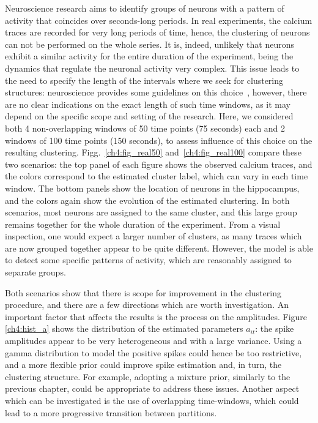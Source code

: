 Neuroscience research aims to identify groups of neurons with a pattern of activity that coincides over seconds-long periods.
In real experiments, the calcium traces are recorded for very long periods of time, hence, the clustering of neurons can not be performed on the whole series. It is, indeed, unlikely that neurons exhibit a similar activity for the entire duration of the experiment, being the dynamics that regulate the neuronal activity very complex. 
This issue leads to the need to specify the length of the intervals where we seek for clustering structures: neuroscience provides some guidelines on this choice~\parencite{Bittner2017}, however, there are no clear indications on the exact length of such time windows, as it may depend on the specific scope and setting of the research. 
%
Here, we considered both 4 non-overlapping windows of 50 time points (75 seconds) each and 2 windows of 100 time points (150 seconds), to assess influence of this choice on the resulting clustering. Figg.~\ref{ch4:fig_real50} and~\ref{ch4:fig_real100} compare these two scenarios: the top panel of each figure shows the observed calcium traces, and the colors correspond to the estimated cluster label, which can vary in each time window. The bottom panels show the location of neurons in the hippocampus, and the colors again show the evolution of the estimated clustering. In both scenarios, most neurons are assigned to the same cluster, and this large group remains together for the whole duration of the experiment. 
From a visual inspection, one would expect a larger number of clusters, as many traces which are now grouped together appear to be quite different. However, the model is able to detect some specific patterns of activity, which are reasonably assigned to separate groups.

Both scenarios show that there is scope for improvement in the clustering procedure, and there are a few directions which are worth investigation.
An important factor that affects the results is the process on the amplitudes. Figure \ref{ch4:hist_a} shows the distribution of the estimated parameters $a_{it}$: the spike amplitudes appear to be very heterogeneous and with a large variance. Using a gamma distribution to model the positive spikes could hence be too restrictive, and a more flexible prior could improve spike estimation and, in turn, the clustering structure. For example, adopting a mixture prior, similarly to the previous chapter, could be appropriate to address these issues. Another aspect which can be investigated is the use of overlapping time-windows, which could lead to a more progressive transition between partitions. 



